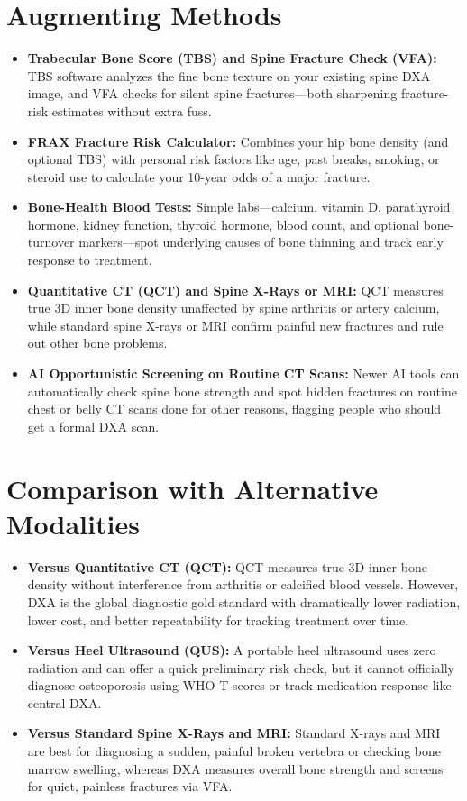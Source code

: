 \section{Augmenting Methods}
\begin{itemize}
\item \textbf{Trabecular Bone Score (TBS) and Spine Fracture Check (VFA):} TBS software analyzes the fine bone texture on your existing spine DXA image, and VFA checks for silent spine fractures---both sharpening fracture-risk estimates without extra fuss.
\item \textbf{FRAX Fracture Risk Calculator:} Combines your hip bone density (and optional TBS) with personal risk factors like age, past breaks, smoking, or steroid use to calculate your 10-year odds of a major fracture.
\item \textbf{Bone-Health Blood Tests:} Simple labs---calcium, vitamin D, parathyroid hormone, kidney function, thyroid hormone, blood count, and optional bone-turnover markers---spot underlying causes of bone thinning and track early response to treatment.
\item \textbf{Quantitative CT (QCT) and Spine X-Rays or MRI:} QCT measures true 3D inner bone density unaffected by spine arthritis or artery calcium, while standard spine X-rays or MRI confirm painful new fractures and rule out other bone problems.
\item \textbf{AI Opportunistic Screening on Routine CT Scans:} Newer AI tools can automatically check spine bone strength and spot hidden fractures on routine chest or belly CT scans done for other reasons, flagging people who should get a formal DXA scan.
\end{itemize}

\section{Comparison with Alternative Modalities}
\begin{itemize}
\item \textbf{Versus Quantitative CT (QCT):} QCT measures true 3D inner bone density without interference from arthritis or calcified blood vessels. However, DXA is the global diagnostic gold standard with dramatically lower radiation, lower cost, and better repeatability for tracking treatment over time.
\item \textbf{Versus Heel Ultrasound (QUS):} A portable heel ultrasound uses zero radiation and can offer a quick preliminary risk check, but it cannot officially diagnose osteoporosis using WHO T-scores or track medication response like central DXA.
\item \textbf{Versus Standard Spine X-Rays and MRI:} Standard X-rays and MRI are best for diagnosing a sudden, painful broken vertebra or checking bone marrow swelling, whereas DXA measures overall bone strength and screens for quiet, painless fractures via VFA.
\end{itemize}

